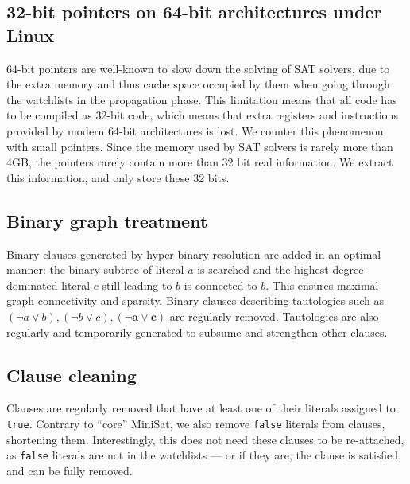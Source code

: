 \documentclass[final]{ieee}
\begin{document}
\subsection{32-bit pointers on 64-bit architectures under Linux}
64-bit pointers are well-known to slow down the solving of SAT solvers, due to the extra memory and thus cache space occupied by them when going through the watchlists in the propagation phase. This limitation means that all code has to be compiled as 32-bit code, which means that extra registers and instructions provided by modern 64-bit architectures is lost. We counter this phenomenon with small pointers. Since the memory used by SAT solvers is rarely more than 4GB, the pointers rarely contain more than 32 bit real information. We extract this information, and only store these 32 bits. %

\subsection{Binary graph treatment}
Binary clauses generated by hyper-binary resolution \cite{DBLP:conf/sat/GershmanS05} are added in an optimal manner: the binary subtree of literal $a$ is searched and the highest-degree dominated literal $c$ still leading to $b$ is connected to $b$. This ensures maximal graph connectivity and sparsity. Binary clauses describing tautologies such as $(\neg a \vee b), (\neg b \vee c), \mathbf{(\neg a \vee c)}$ are regularly removed. Tautologies are also regularly and temporarily generated to subsume and strengthen other clauses.

\subsection{Clause cleaning}
Clauses are regularly removed that have at least one of their literals assigned to \texttt{true}. Contrary to ``core'' MiniSat, we also remove \texttt{false} literals from clauses, shortening them. Interestingly, this does not need these clauses to be re-attached, as \texttt{false} literals are not in the watchlists --- or if they are, the clause is satisfied, and can be fully removed.

\end{document}
